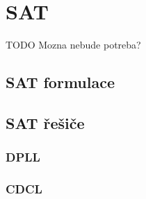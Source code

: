 \chapter{SAT}

TODO Mozna nebude potreba?


\section{SAT formulace}
\section{SAT řešiče}
\subsection{DPLL}
\subsection{CDCL}